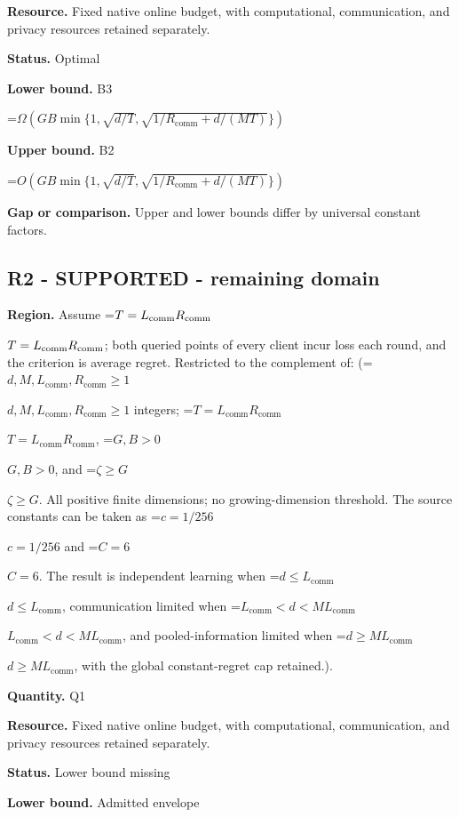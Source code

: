 \documentclass[10pt,a4paper]{article}
\newcommand{\AtlasMath}[1]{\par\begingroup\centering\setbox0=\hbox{$\displaystyle #1$}\ifdim\wd0>1.4\linewidth\typeout{ATLAS WIDE FORMULA: \the\wd0}\fi\ifdim\wd0>\linewidth\resizebox{\linewidth}{!}{\box0}\else\box0\fi\par\endgroup}
\newcommand{\AtlasInlineMath}[1]{\begingroup\setbox0=\hbox{$#1$}\ifdim\wd0>.4\linewidth\endgroup\AtlasMath{#1}\else\endgroup$#1$\fi}
\begin{document}
\textbf{Resource.} Fixed native online budget, with computational, communication, and privacy resources retained separately.



\textbf{Status.} Optimal



\textbf{Lower bound.} B3



\AtlasMath{\Omega\!\left(GB\min\{1,\sqrt{d/T},\sqrt{1/R_{\mathrm{comm}}+d/(MT)}\}\right)}


\textbf{Upper bound.} B2



\AtlasMath{O\!\left(GB\min\{1,\sqrt{d/T},\sqrt{1/R_{\mathrm{comm}}+d/(MT)}\}\right)}


\textbf{Gap or comparison.} Upper and lower bounds differ by universal constant factors.



\subsection{R2 - SUPPORTED - remaining domain}


\textbf{Region.} Assume \AtlasInlineMath{T=L_{\rm comm} R_{\rm comm}}; both queried points of every client incur loss each round, and the criterion is average regret. Restricted to the complement of: (\AtlasInlineMath{d,M,L_{\mathrm{comm}},R_{\mathrm{comm}}\ge1} integers; \AtlasInlineMath{T=L_{\mathrm{comm}}R_{\mathrm{comm}}}, \AtlasInlineMath{G,B>0}, and \AtlasInlineMath{\zeta\ge G}. All positive finite dimensions; no growing-dimension threshold. The source constants can be taken as \AtlasInlineMath{c=1/256} and \AtlasInlineMath{C=6}. The result is independent learning when \AtlasInlineMath{d\le L_{\mathrm{comm}}}, communication limited when \AtlasInlineMath{L_{\mathrm{comm}}<d<ML_{\mathrm{comm}}}, and pooled-information limited when \AtlasInlineMath{d\ge ML_{\mathrm{comm}}}, with the global constant-regret cap retained.).



\textbf{Quantity.} Q1



\textbf{Resource.} Fixed native online budget, with computational, communication, and privacy resources retained separately.



\textbf{Status.} Lower bound missing



\textbf{Lower bound.} Admitted envelope
\end{document}
